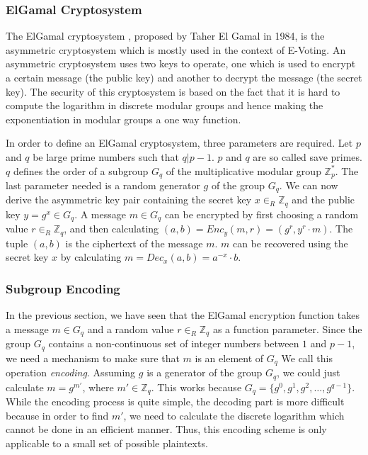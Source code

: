 \documentclass[numbers=noenddot, abstract=on]{scrreprt}
\begin{document}
\subsubsection{ElGamal Cryptosystem}
\label{sec:elgamal}
The ElGamal cryptosystem \cite{EG84},
proposed by Taher El Gamal in 1984, is the asymmetric cryptosystem which is mostly used in the
context of E-Voting. An asymmetric cryptosystem uses two keys to operate, one
which is used to encrypt a certain message (the public key) and another to
decrypt the message (the secret key). The security of this cryptosystem is based
on the fact that it is hard to compute the logarithm in discrete modular groups
and hence making the exponentiation in modular groups a one way function. 

In order to define an ElGamal cryptosystem, three parameters are required. Let
$p$ and $q$ be large prime numbers such that $q|p-1$. $p$ and $q$ are so
called save primes. $q$ defines the order of a subgroup $G_q$ of the
multiplicative modular group $\mathbb{Z}^*_p$. The last parameter needed is a random generator
$g$ of the group $G_q$. We can now derive the asymmetric key pair containing the
secret key $x \in_R \mathbb{Z}_q$ and the public key $y=g^x \in G_q$. A message
$m \in G_q$ can be encrypted by first choosing a random value $r \in_R
\mathbb{Z}_q$, and then calculating $(a, b)=Enc_y(m, r)=(g^r, y^r \cdot m)$. The
tuple $(a, b)$ is the ciphertext of the message $m$. $m$ can be recovered using the secret key $x$
by calculating $m=Dec_x(a, b)=a^{-x} \cdot b$.

\subsubsection{Subgroup Encoding}
\label{sec:subgroupencoding}
In the previous section, we have seen that the ElGamal encryption function takes
a message $m \in G_q$ and a random value $r \in_R \mathbb{Z}_q$ as a function
parameter. Since the group $G_q$ contains a non-continuous set of integer numbers
between $1$ and $p-1$, we need a mechanism to make sure that $m$ is an element
of $G_q$ We call this operation \textit{encoding}.
Assuming $g$ is a generator of the group $G_q$, we could just calculate
$m=g^{m'}$, where $m' \in \mathbb{Z}_q$. This works because $G_q = \{g^0, g^1,
g^2, \ldots, g^{q-1}\}$. While the encoding process is quite simple, the
decoding part is more difficult because in order to find $m'$, we need to
calculate the discrete logarithm which cannot be done in an efficient manner.
Thus, this encoding scheme is only applicable to a small set of possible
plaintexts.
\end{document}
